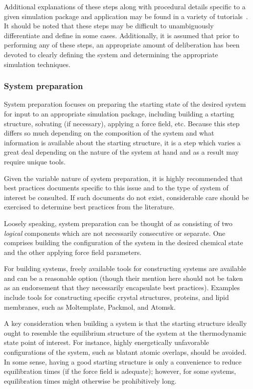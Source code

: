 \documentclass[9pt,bestpractices]{livecoms}
\begin{document}
Additional explanations of these steps along with procedural details specific to a given simulation package and application may be found in a variety of tutorials~\cite{LemkulTutorials,AmberBeginner}.
It should be noted that these steps may be difficult to unambiguously differentiate and define in some cases.
Additionally, it is assumed that prior to performing any of these steps, an appropriate amount of deliberation has been devoted to clearly defining the system and determining the appropriate simulation techniques.

\subsubsection{System preparation}

System preparation focuses on preparing the starting state of the desired system for input to an appropriate simulation package, including building a starting structure, solvating (if necessary), applying a force field, etc.
Because this step differs so much depending on the composition of the system and what information is available about the starting structure, it is a step which varies a great deal depending on the nature of the system at hand and as a result may require unique tools.

Given the variable nature of system preparation, it is highly recommended that best practices documents specific to this issue and to the type of system of interest be consulted.
If such documents do not exist, considerable care should be exercised to determine best practices from the literature.

Loosely speaking, system preparation can be thought of as consisting of two \emph{logical} components which are not necessarily consecutive or separate.
One comprises building the configuration of the system in the desired chemical state and the other applying force field parameters.

For building systems, freely available tools for constructing systems are available and can be a reasonable option (though their mention here should not be taken as an endorsement that they necessarily encapsulate best practices).
Examples include tools for constructing specific crystal structures, proteins, and lipid membranes, such as Moltemplate, Packmol, and Atomsk.

A key consideration when building a system is that the starting structure ideally ought to resemble the equilibrium structure of the system at the thermodynamic state point of interest.
For instance, highly energetically unfavorable configurations of the system, such as blatant atomic overlaps, should be avoided.
In some sense, having a good starting structure is only a convenience to reduce equilibration times (if the force field is adequate); however, for some systems, equilibration times might otherwise be prohibitively long.
\end{document}
